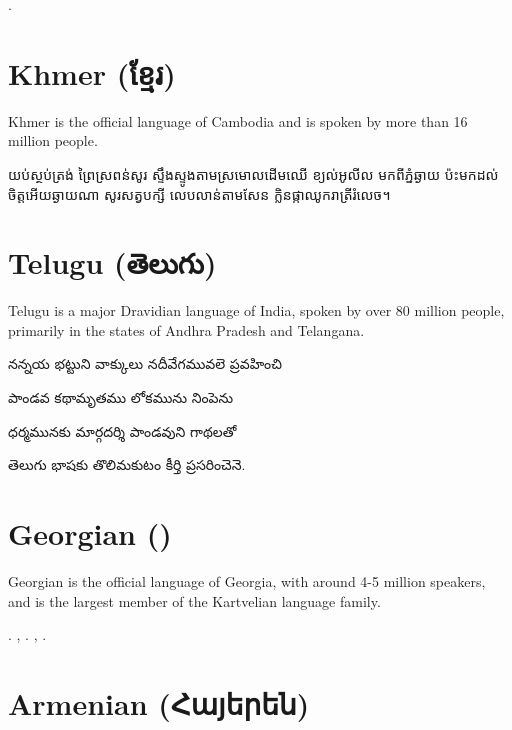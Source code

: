 \documentclass[a4paper,twoside]{article}
\begin{document}


.

\section{Khmer (\textkhmer{ខ្មែរ})}\label{khmer-khmaer}

Khmer is the official language of Cambodia and is spoken by more than 16 million people.

\textkhmer{យប់ស្ថប់ត្រង់ ព្រៃស្រពន់សូរ ស្ទឹងស្ទូងតាមស្រមោលដើមឈើ
ខ្យល់អូលីល មកពីភ្នំឆ្ងាយ ប៉ះមកដល់ចិត្តអើយឆ្ងាយណា
សូរសត្វបក្សី លេបលាន់តាមសែន ក្លិនផ្កាឈូករាត្រីរំលេច។}

\section{Telugu (\texttelugu{తెలుగు})}\label{telugu-telugu}

Telugu is a major Dravidian language of India, spoken by over 80 million people, primarily in the states of Andhra Pradesh and Telangana.

\texttelugu{నన్నయ భట్టుని వాక్కులు నదీవేగమువలె ప్రవహించి}

\texttelugu{పాండవ కథామృతము లోకమును నింపెను}

\texttelugu{ధర్మమునకు మార్గదర్శి పాండవుని గాథలతో}

\texttelugu{తెలుగు భాషకు తొలిమకుటం కీర్తి ప్రసరించెనె}.

\section{Georgian ()}\label{georgian-k-art-uli}

Georgian is the official language of Georgia, with around 4-5 million speakers, and is the largest member of the Kartvelian language family.

.
, .
,
.

\section{Armenian (\textarmenian{Հայերեն})}\label{armenian-hayeren}
\end{document}
